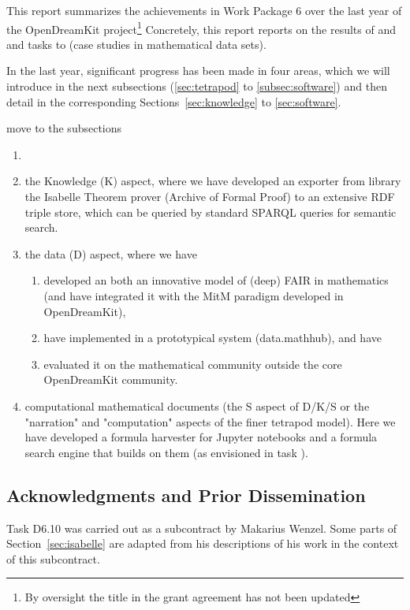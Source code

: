 This report summarizes the achievements in Work Package 6 over the last year of the OpenDreamKit project\footnote{By oversight the title in the grant agreement has not been updated} Concretely, this report reports on the results of  and  and tasks  to  (case studies in mathematical data sets).

In the last year, significant progress has been made in four areas, which we will introduce in the next subsections (\ref{sec:tetrapod} to \ref{subsec:software}) and then detail in the corresponding Sections~\ref{sec:knowledge} to \ref{sec:software}.

\begin{oldpart}{move to the subsections}
\begin{enumerate}
\item \item the Knowledge (K) aspect, where we have developed an exporter from library the Isabelle Theorem prover (Archive of Formal Proof) to an extensive RDF triple store, which can be queried by standard SPARQL queries for semantic search. \item the data (D) aspect, where we have
  \begin{enumerate}
  \item developed an both an innovative model of (deep) FAIR in mathematics (and have integrated it with the MitM paradigm developed in OpenDreamKit),
  \item have implemented in a prototypical system (data.mathhub), and have
  \item evaluated it on the mathematical community outside the core OpenDreamKit community.
  \end{enumerate}
\item computational mathematical documents (the S aspect of D/K/S or the "narration" and "computation" aspects of the finer tetrapod model). Here we have developed a formula harvester for Jupyter notebooks and a formula search engine that builds on them (as envisioned in task ).
\end{enumerate}
\end{oldpart}






\subsection{Acknowledgments and Prior Dissemination}
Task D6.10  was carried out as a subcontract by Makarius Wenzel.
Some parts of Section~\ref{sec:isabelle} are adapted from his descriptions of his work in the context of this subcontract.

